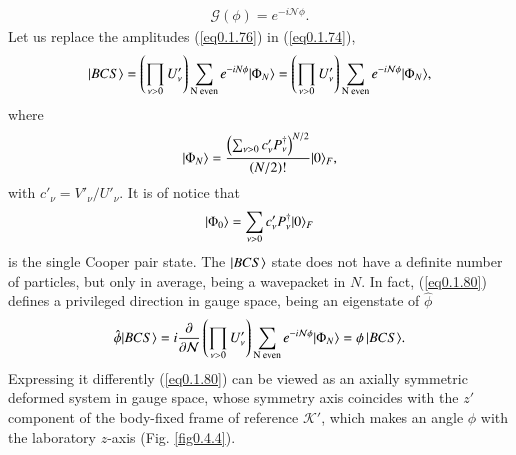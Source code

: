 \begin{align}\label{eq0.1.79}
\mathcal G(\phi)=e^{-i\mathcal N\phi}.
\end{align}
Let us replace the amplitudes (\ref{eq0.1.76}) in  (\ref{eq0.1.74}),
\begin{align}\label{eq0.1.80}
|{BCS} \rangle=\left(\prod_{\nu>0}U'_\nu\right)\sum_{\text{N even}}e^{-iN\phi}|{\Phi_{N}} \rangle=\left(\prod_{\nu>0}U'_\nu\right)\sum_{\text{N even}}e^{-i\mathcal N\phi}|{\Phi_{N}} \rangle,
\end{align}
where
\begin{align}\label{eq0.1.81}
|{\Phi_{N}} \rangle=\frac{\left(\sum_{\nu>0}c'_\nu P^\dagger_\nu\right)^{N/2}}{\left(N/2\right)!}|{0} \rangle_F,
\end{align}
with $c'_\nu=V'_\nu/U'_\nu$. It is of notice that
\begin{align}\label{eq0.1.82}
|{\Phi_0} \rangle=\sum_{\nu>0}c'_\nu P^\dagger_\nu|{0} \rangle_F
\end{align}
is the single Cooper pair state.  The  $|{BCS} \rangle$ state does not have a definite number of particles, but only in average, being a wavepacket in $N$. 
In fact, (\ref{eq0.1.80}) defines a privileged direction in gauge space, being an eigenstate of $\hat\phi$ 
\begin{align}\label{eq0.1.83}
\hat\phi|{BCS} \rangle=i\frac{\partial}{\partial \mathcal N}\left(\prod_{\nu>0}U'_\nu\right)\sum_{\text{N even}}e^{-i\mathcal N\phi}|{\Phi_{N}} \rangle=\phi\,|{BCS} \rangle.
\end{align}
Expressing it differently (\ref{eq0.1.80}) can be viewed as an axially symmetric deformed system in gauge space, whose symmetry axis coincides with the $z'$ component of the body-fixed frame of reference $\mathcal K'$, which makes an angle $\phi$ with the laboratory $z$-axis (Fig. \ref{fig0.4.4}). 


